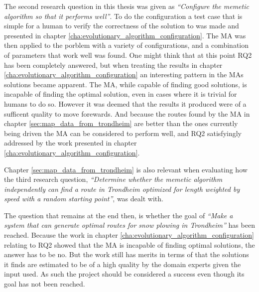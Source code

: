 The second research question in this thesis was given as \emph{\enquote{Configure the memetic algorithm so that it performs well}}. To do the configuration a test case that is simple for a human to verify the correctness of the solution to was made and presented in chapter \ref{cha:evolutionary_algorithm_configuration}. The MA was then applied to the porblem with a variety of configurations, and a combination of parameters that work well was found. One might think that at this point RQ2 has been completely answered, but when treating the results in chapter \ref{cha:evolutionary_algorithm_configuration} an interesting pattern in the MAs solutions became apparent. The MA, while capable of finding good solutions, is incapable of finding the optimal solution, even in cases where it is trivial for humans to do so. However it was deemed that the results it produced were of a sufficent quality to move forewards. And because the routes found by the MA in chapter \ref{sec:map_data_from_trondheim} are better than the ones currently being driven the MA can be considered to perform well, and RQ2 satisfyingly addressed by the work presented in chapter \ref{cha:evolutionary_algorithm_configuration}.

Chapter \ref{sec:map_data_from_trondheim} is also relevant when evaluating how the third research question, \emph{\enquote{Determine whether the memetic algorithm independently can find a route in Trondheim optimized for length weighted by speed with a random starting point}}, was dealt with. 


The question that remains at the end then, is whether the goal of \emph{\enquote{Make a system that can generate optimal routes for snow plowing in Trondheim}} has been reached. Because the work in chapter \ref{cha:evolutionary_algorithm_configuration} relating to RQ2 showed that the MA is incapable of finding optimal solutions, the answer has to be no. But the work still has merits in terms of that the solutions it finds are estimated to be of a high quality by the domain experts given the input used. As such the project should be considered a success even though its goal has not been reached.



